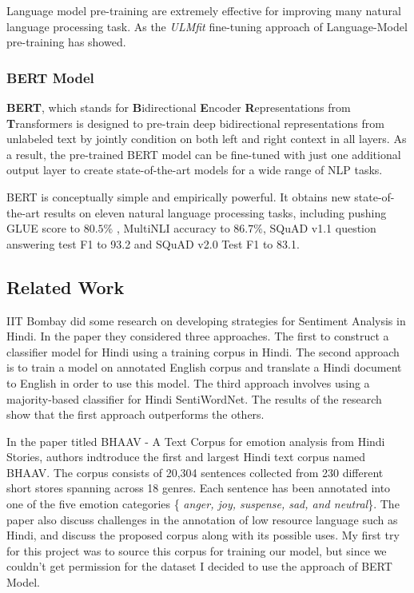 \documentclass[a4paper, 12pt]{article}
\begin{document}
\begin{sloppypar}
Language model pre-training are extremely effective for improving many natural language processing task. As the \textit{ULMfit} fine-tuning approach of Language-Model pre-training has showed. \cite{howard_universal_2018}

\subsubsection{BERT Model}

\textbf{BERT}, which stands for \textbf{B}idirectional  \textbf{E}ncoder  \textbf{R}epresentations from  \textbf{T}ransformers is designed to pre-train deep bidirectional representations from unlabeled text by jointly condition on both left and right context in all layers. As a result, the pre-trained BERT model can be fine-tuned with just one additional output layer to create state-of-the-art models for a wide range of NLP tasks. \cite{devlin_bert_2019}

BERT is conceptually simple and empirically powerful. It obtains new state-of-the-art results on eleven natural language processing tasks, including pushing GLUE\cite{wang_glue_2018}
 score to $80.5 \%$ , MultiNLI\cite{williams_broad-coverage_2018}
accuracy to $86.7\%$, SQuAD v1.1\cite{rajpurkar_squad_2016}
question answering test F1 to 93.2  and SQuAD v2.0\cite{rajpurkar_squad_2016}
Test F1 to 83.1.\cite{devlin_bert_2019}

\subsection{Related Work}

IIT Bombay did some research on developing strategies  for Sentiment Analysis in Hindi.  In the paper they considered three approaches. The first to construct a classifier model for Hindi using a training corpus in Hindi. The second approach is to train a model on annotated English corpus and translate a Hindi document to English in order to use this model. The third approach involves using a majority-based classifier for Hindi SentiWordNet. The results of the research show that the first approach outperforms the others.\cite{joshi_fall-back_nodate}

In the paper titled BHAAV - A Text Corpus for emotion analysis from Hindi Stories, authors indtroduce the first and largest Hindi text corpus named BHAAV. The corpus consists of 20,304 sentences collected from 230 different short stores spanning across 18 genres. Each sentence has been annotated into one of the five emotion categories \{ \textit{anger, joy, suspense, sad, and neutral}\}. The paper also discuss challenges in the annotation of low resource language such as Hindi, and discuss the proposed corpus along with its possible uses.\cite{kumar_bhaav_2019}
My first try for this project was to source this corpus for training our model, but since we couldn't get permission for the dataset I decided to use the approach of BERT Model.
\clearpage

\end{sloppypar}
\end{document}
